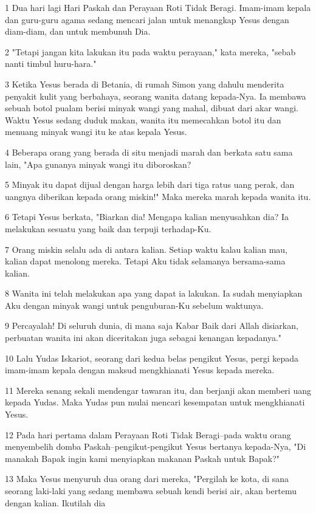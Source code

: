 \par 1 Dua hari lagi Hari Paskah dan Perayaan Roti Tidak Beragi. Imam-imam kepala dan guru-guru agama sedang mencari jalan untuk menangkap Yesus dengan diam-diam, dan untuk membunuh Dia.
\par 2 "Tetapi jangan kita lakukan itu pada waktu perayaan," kata mereka, "sebab nanti timbul huru-hara."
\par 3 Ketika Yesus berada di Betania, di rumah Simon yang dahulu menderita penyakit kulit yang berbahaya, seorang wanita datang kepada-Nya. Ia membawa sebuah botol pualam berisi minyak wangi yang mahal, dibuat dari akar wangi. Waktu Yesus sedang duduk makan, wanita itu memecahkan botol itu dan menuang minyak wangi itu ke atas kepala Yesus.
\par 4 Beberapa orang yang berada di situ menjadi marah dan berkata satu sama lain, "Apa gunanya minyak wangi itu diboroskan?
\par 5 Minyak itu dapat dijual dengan harga lebih dari tiga ratus uang perak, dan uangnya diberikan kepada orang miskin!" Maka mereka marah kepada wanita itu.
\par 6 Tetapi Yesus berkata, "Biarkan dia! Mengapa kalian menyusahkan dia? Ia melakukan sesuatu yang baik dan terpuji terhadap-Ku.
\par 7 Orang miskin selalu ada di antara kalian. Setiap waktu kalau kalian mau, kalian dapat menolong mereka. Tetapi Aku tidak selamanya bersama-sama kalian.
\par 8 Wanita ini telah melakukan apa yang dapat ia lakukan. Ia sudah menyiapkan Aku dengan minyak wangi untuk penguburan-Ku sebelum waktunya.
\par 9 Percayalah! Di seluruh dunia, di mana saja Kabar Baik dari Allah disiarkan, perbuatan wanita ini akan diceritakan juga sebagai kenangan kepadanya."
\par 10 Lalu Yudas Iskariot, seorang dari kedua belas pengikut Yesus, pergi kepada imam-imam kepala dengan maksud mengkhianati Yesus kepada mereka.
\par 11 Mereka senang sekali mendengar tawaran itu, dan berjanji akan memberi uang kepada Yudas. Maka Yudas pun mulai mencari kesempatan untuk mengkhianati Yesus.
\par 12 Pada hari pertama dalam Perayaan Roti Tidak Beragi--pada waktu orang menyembelih domba Paskah--pengikut-pengikut Yesus bertanya kepada-Nya, "Di manakah Bapak ingin kami menyiapkan makanan Paskah untuk Bapak?"
\par 13 Maka Yesus menyuruh dua orang dari mereka, "Pergilah ke kota, di sana seorang laki-laki yang sedang membawa sebuah kendi berisi air, akan bertemu dengan kalian. Ikutilah dia
